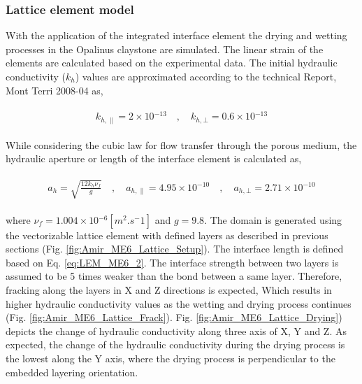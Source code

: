 \subsubsection*{Lattice element model}

With the application of the integrated interface element \cite{Sattarietal2019b} the drying and wetting processes in the Opalinus claystone are simulated. The linear strain of the elements are calculated based on the experimental data. The initial hydraulic conductivity ($k_h$) values are approximated according to the technical Report, Mont Terri 2008-04 as,

\begin{align}
\label{eq:LEM_ME6_1}
\begin{split}
k_{h,\parallel}=2\times{10}{^{-13}}
\quad , \quad
k_{h,\bot}=0.6\times{10}{^{-13}}
\end{split}
\end{align}

While considering the cubic law for flow transfer through the porous medium, the hydraulic aperture or length of the interface element is calculated as,

\begin{align}
\label{eq:LEM_ME6_2}
\begin{split}
a_h=\sqrt{\frac{12k_h\nu_f}{g}}
\quad , \quad
a_{h,\parallel}=4.95\times{10}{^{-10}}
\quad , \quad
a_{h,\bot}=2.71\times{10}{^{-10}}
\end{split}
\end{align}

where $\nu_f=1.004\times{10}{^{-6} [m^2.s^-1]}$ and $g=9.8$. The domain is generated using the vectorizable lattice element with defined layers as described in previous sections (Fig. \ref{fig:Amir_ME6_Lattice_Setup}). The interface length is defined based on Eq. \ref{eq:LEM_ME6_2}. The interface strength between two layers is assumed to be 5 times weaker than the bond between a same layer. Therefore, fracking along the layers in X and Z directions is expected, Which results in higher hydraulic conductivity values as the wetting and drying process continues (Fig. \ref{fig:Amir_ME6_Lattice_Frack}). Fig. \ref{fig:Amir_ME6_Lattice_Drying}) depicts the change of hydraulic conductivity along three axis of X, Y and Z. As expected, the change of the hydraulic conductivity during the drying process is the lowest along the Y axis, where the drying process is perpendicular to the embedded layering orientation. 


